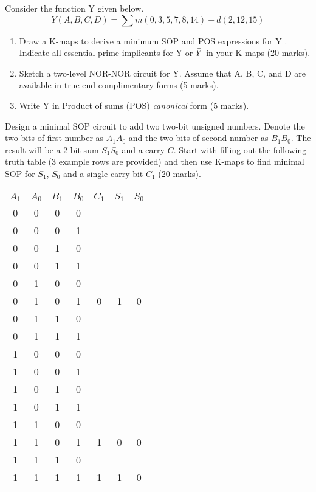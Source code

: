 \begin{prob}
  Consider the function Y given below.
  \[ Y(A, B, C, D) = \sum m(0, 3, 5, 7, 8, 14) + d(2, 12, 15) \]
  \begin{enumerate}
    \item Draw a K-maps to derive a minimum SOP and POS expressions for Y .
      Indicate all essential prime implicants for Y or $\bar{Y}$ in your K-maps (20 marks).
    \item Sketch a two-level NOR-NOR circuit for Y. Assume that A, B, C, and D are available in true end complimentary forms (5 marks).
    \item Write Y in Product of sums (POS) \emph{canonical} form (5 marks).
  \end{enumerate}
\end{prob}

\begin{prob}
  Design a minimal SOP circuit to add two two-bit unsigned numbers. Denote the two bits of first number as $A_1A_0$ and the two bits of second number as $B_1B_0$. The result will be a 2-bit sum $S_1S_0$ and a carry $C$. Start with filling out the following truth table (3 example rows are provided) and then use K-maps to find minimal SOP for $S_1$, $S_0$ and a single carry bit $C_1$ (20 marks).\\
  \begin{tabular}{cccc|ccc}
    \toprule
    $A_1$ & $A_0$ & $B_1$ & $B_0$ & $C_1$ & $S_1$ & $S_0$  \\
    \midrule
    0 & 0 & 0 & 0 &   &   &   \\
    0 & 0 & 0 & 1 &   &   &   \\
    0 & 0 & 1 & 0 &   &   &   \\
    0 & 0 & 1 & 1 &   &   &   \\
    0 & 1 & 0 & 0 &   &   &   \\
    0 & 1 & 0 & 1 & 0 & 1 & 0 \\
    0 & 1 & 1 & 0 &   &   &   \\
    0 & 1 & 1 & 1 &   &   &   \\
    1 & 0 & 0 & 0 &   &   &   \\
    1 & 0 & 0 & 1 &   &   &   \\
    1 & 0 & 1 & 0 &   &   &   \\
    1 & 0 & 1 & 1 &   &   &   \\
    1 & 1 & 0 & 0 &   &   &   \\
    1 & 1 & 0 & 1 & 1 & 0 & 0 \\
    1 & 1 & 1 & 0 &   &   &   \\
    1 & 1 & 1 & 1 & 1 & 1 & 0 \\
    \bottomrule
  \end{tabular}
\end{prob}

